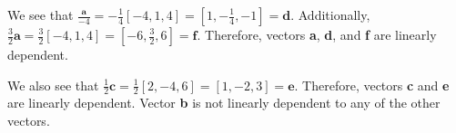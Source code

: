\begin{Answer}[ref = colinear]
We see that $\frac{\textbf{a}}{-4} = -\frac{1}{4} \left[ -4, 1, 4 \right] = 
\left[ 1, -\frac{1}{4}, -1 \right] = \textbf{d}$. Additionally, $\frac{3}{2} 
\textbf{a} = \frac{3}{2} \left[ -4, 1, 4 \right] = \left[ -6, \frac{3}{2}, 6 
\right] = \textbf{f}$. Therefore, vectors \textbf{a}, \textbf{d}, and \textbf{f} 
are linearly dependent. 

We also see that $\frac{1}{2} \textbf{c} = \frac{1}{2} \left[ 2, -4, 6 \right] 
= \left[ 1, -2, 3 \right] = \textbf{e}$. Therefore, vectors \textbf{c} and 
\textbf{e} are linearly dependent. Vector \textbf{b} is not linearly dependent 
to any of the other vectors. 
\end{Answer}
